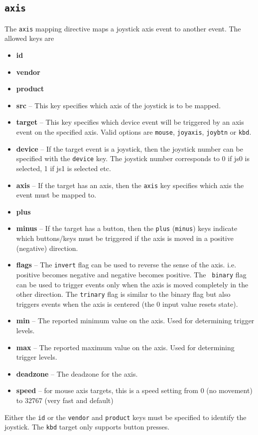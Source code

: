 \documentclass{article}
\begin{document}
\subsection{{\tt axis}}
The {\tt axis} mapping directive maps a joystick axis event 
to another event. The allowed keys are 
\begin{itemize}
	\item {\bf id}
	\item {\bf vendor}
	\item {\bf product}
	\item {\bf src} -- This key specifies which axis of the joystick is to be mapped.
	\item {\bf target} -- This key specifies which device event will be triggered
				by an axis event on the specified axis. Valid
				options are {\tt mouse}, {\tt joyaxis}, {\tt joybtn} or {\tt kbd}.
	\item {\bf device} -- If the target event is a joystick, then the joystick 
				number can be specified with the {\tt device} key.
				The joystick number corresponds to 0 if js0 is selected, 1 if js1 is selected etc.
	\item {\bf axis} -- If the target has an axis, then the {\tt axis} key specifies
				which axis the event must be mapped to.
	\item {\bf plus} 
	\item {\bf minus} -- If the target has a button, then the {\tt plus} ({\tt minus})
				keys indicate which buttons/keys must be triggered
				if the axis is moved in a positive (negative) direction.
	\item {\bf flags} -- The {\tt invert} flag can be used to reverse the sense of the
				axis. i.e. positive becomes negative and negative becomes positive. The {\tt
                binary} flag can be used to trigger events only when the axis is moved
                completely in the other direction. The {\tt trinary} flag is similar to the binary flag
                but also triggers events when the axis is centered (the 0 input value resets state).
    \item {\bf min} -- The reported minimum value on the axis. Used for determining trigger levels.
    \item {\bf max} -- The reported maximum value on the axis. Used for determining trigger levels.
    \item {\bf deadzone} -- The deadzone for the axis.
    \item {\bf speed} -- for mouse axis targets, this is a speed setting from 0 (no movement) to 32767 (very fast and default)
\end{itemize}
Either the {\tt id} or the {\tt vendor} and {\tt product} keys must be specified to identify the
joystick. The {\tt kbd} target only supports button presses.
\end{document}
